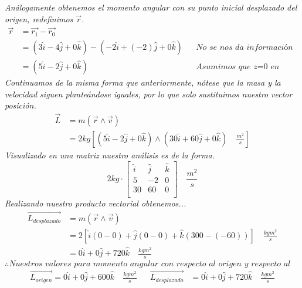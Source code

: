 \documentclass{article}
\begin{document}
\noindent \textit{Análogamente obtenemos el momento angular con su punto inicial desplazado del origen, redefinimos $\vec{r}$.}
\begin{align*}
    \vec{r} &= \vec{r_1} - \vec{r_0} \\
    &= (3\hat{i} - 4\hat{j} + 0\hat{k}) - (-2\hat{i} + (-2)\hat{j} + 0\hat{k}) && \textit{No se nos da información sobre la extrada z}\\
    &= (5\hat{i} - 2\hat{j} + 0\hat{k}) && \textit{Asumimos que z=0 en todo momento}
\end{align*}
\textit{Continuamos de la misma forma que anteriormente, nótese que la masa y la velocidad siguen planteándose iguales, por lo que solo sustituimos nuestro vector posición.}
\begin{align*}
    \vec{L} &= m(\vec{r} \land \vec{v}) \\
    &= 2kg\left[(5\hat{i} - 2\hat{j} + 0\hat{k}) \land (30\hat{i} + 60\hat{j} + 0\hat{k} ) \quad \frac{m^2}{s} \right]    
\end{align*}
\textit{Visualizado en una matriz nuestro análisis es de la forma.}
$$ 2kg \cdot \begin{bmatrix}
    \hat{i} & \hat{j} & \hat{k} \\
    5 & -2 & 0 \\
    30 & 60 & 0 \\
    \end{bmatrix} \quad \frac{m^2}{s}$$
\textit{Realizando nuestro producto vectorial obtenemos...}
\begin{align*}
    \vec{L_{desplazado}} &= m(\vec{r} \land \vec{v}) \\
&= 2[\hat{i}(0-0) + \hat{j}(0-0) + \hat{k}(300-(-60))] \quad \frac{kgm^2}{s} \\
&= 0\hat{i} + 0\hat{j} + 720\hat{k} \quad \frac{kgm^2}{s}
\end{align*}
\[ \therefore \textit{Nuestros valores para momento angular con respecto al origen y respecto al punto establecido son} \]
\begin{align*}
    \vec{L_{origen}} = 0\hat{i} + 0\hat{j} + 600\hat{k} \quad \frac{kgm^2}{s} && \vec{L_{desplazado}} &= 0\hat{i} + 0\hat{j} + 720\hat{k} \quad \frac{kgm^2}{s} \\
\end{align*}
\end{document}
